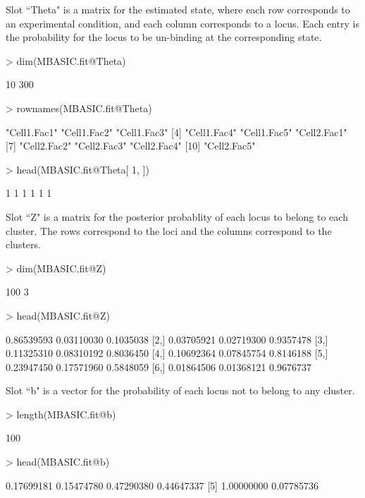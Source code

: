 \documentclass[a4paper,10pt]{article}
\begin{document}
Slot ``Theta" is a matrix for the estimated state, where each row corresponds to an experimental condition, and each column corresponds to a locus. Each entry is the probability for the locus to be un-binding at the corresponding state.

\begin{Schunk}
\begin{Sinput}
> dim(MBASIC.fit@Theta)
\end{Sinput}
\begin{Soutput}
[1]  10 300
\end{Soutput}
\begin{Sinput}
> rownames(MBASIC.fit@Theta)
\end{Sinput}
\begin{Soutput}
 [1] "Cell1.Fac1" "Cell1.Fac2" "Cell1.Fac3"
 [4] "Cell1.Fac4" "Cell1.Fac5" "Cell2.Fac1"
 [7] "Cell2.Fac2" "Cell2.Fac3" "Cell2.Fac4"
[10] "Cell2.Fac5"
\end{Soutput}
\begin{Sinput}
> head(MBASIC.fit@Theta[ 1, ])
\end{Sinput}
\begin{Soutput}
[1] 1 1 1 1 1 1
\end{Soutput}
\end{Schunk}

Slot ``Z" is a matrix for the posterior probablity of each locus to belong to each cluster. The rows correspond to the loci and the columns correspond to the clusters.

\begin{Schunk}
\begin{Sinput}
> dim(MBASIC.fit@Z)
\end{Sinput}
\begin{Soutput}
[1] 100   3
\end{Soutput}
\begin{Sinput}
> head(MBASIC.fit@Z)
\end{Sinput}
\begin{Soutput}
           [,1]       [,2]      [,3]
[1,] 0.86539593 0.03110030 0.1035038
[2,] 0.03705921 0.02719300 0.9357478
[3,] 0.11325310 0.08310192 0.8036450
[4,] 0.10692364 0.07845754 0.8146188
[5,] 0.23947450 0.17571960 0.5848059
[6,] 0.01864506 0.01368121 0.9676737
\end{Soutput}
\end{Schunk}

Slot ``b" is a vector for the probability of each locus not to belong to any cluster.

\begin{Schunk}
\begin{Sinput}
> length(MBASIC.fit@b)
\end{Sinput}
\begin{Soutput}
[1] 100
\end{Soutput}
\begin{Sinput}
> head(MBASIC.fit@b)
\end{Sinput}
\begin{Soutput}
[1] 0.17699181 0.15474780 0.47290380 0.44647337
[5] 1.00000000 0.07785736
\end{Soutput}
\end{Schunk}
\end{document}
